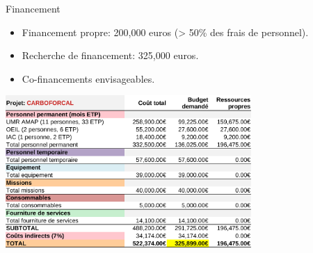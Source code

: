 \documentclass[10pt,table,dvipsnames,compress]{beamer}
\begin{document}
\begin{frame}[label={sec:orgc99c5fe}]{Financement}
\begin{itemize}
\item Financement propre: 200,000 euros (> 50\% des frais de personnel).
\item Recherche de financement: 325,000 euros.
\item Co-financements envisageables.
\end{itemize}

\begin{center}
\includegraphics[width=0.7\textwidth]{tabs/budget_Projet.png}
\end{center}
\end{frame}


\end{document}
